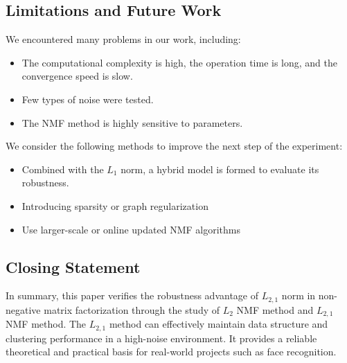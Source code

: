 \subsection{Limitations and Future Work}

We encountered many problems in our work, including:

\begin{itemize}
    \item The computational complexity is high, the operation time is long, and the convergence speed is slow.
    \item Few types of noise were tested. 
    \item The NMF method is highly sensitive to parameters.
\end{itemize}

\bigskip

We consider the following methods to improve the next step of the experiment:

\begin{itemize}
    \item Combined with the $L_1$ norm, a hybrid model is formed to evaluate its robustness.
    \item Introducing sparsity or graph regularization
    \item Use larger-scale or online updated NMF algorithms
\end{itemize}

\subsection{Closing Statement}

In summary, this paper verifies the robustness advantage of $L_{2,1}$ norm in non-negative matrix factorization through the study of $L_2$ NMF method and $L_{2,1}$ NMF method. The $L_{2,1}$ method can effectively maintain data structure and clustering performance in a high-noise environment. It provides a reliable theoretical and practical basis for real-world projects such as face recognition.